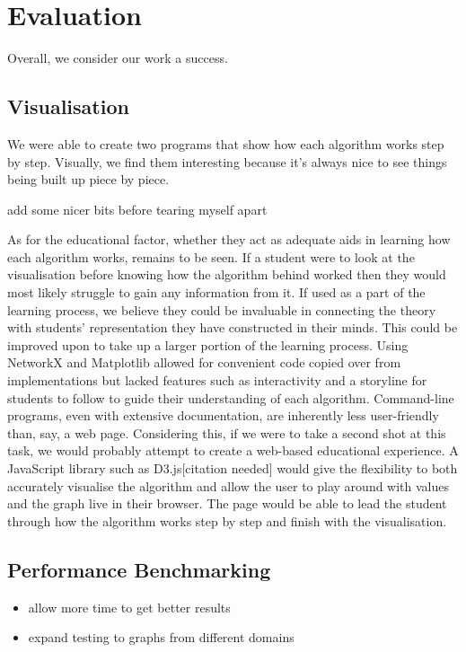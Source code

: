 \section{Evaluation}

Overall, we consider our work a success.

\subsection{Visualisation}

We were able to create two programs that show how each algorithm works
step by step. Visually, we find them interesting because it's always
nice to see things being built up piece by piece.

add some nicer bits before tearing myself apart

As for the educational factor, whether they act as adequate aids in
learning how each algorithm works, remains to be seen. If a student were
to look at the visualisation before knowing how the algorithm behind
worked then they would most likely struggle to gain any information from
it. If used as a part of the learning process, we believe they could be
invaluable in connecting the theory with students' representation they
have constructed in their minds. This could be improved upon to take up
a larger portion of the learning process. Using NetworkX and Matplotlib
allowed for convenient code copied over from implementations but lacked
features such as interactivity and a storyline for students to follow to
guide their understanding of each algorithm. Command-line programs, even
with extensive documentation, are inherently less user-friendly than,
say, a web page. Considering this, if we were to take a second shot at
this task, we would probably attempt to create a web-based educational
experience. A JavaScript library such as D3.js{[}citation needed{]}
would give the flexibility to both accurately visualise the algorithm
and allow the user to play around with values and the graph live in
their browser. The page would be able to lead the student through how
the algorithm works step by step and finish with the visualisation.

\subsection{Performance Benchmarking}

\begin{itemize}
    \item
          allow more time to get better results
    \item
          expand testing to graphs from different domains
\end{itemize}

